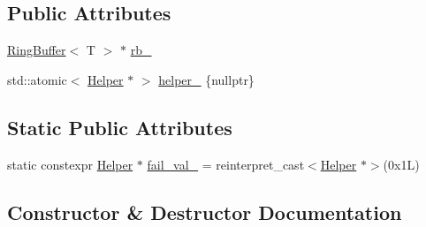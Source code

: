 \subsection*{Public Attributes}
\begin{DoxyCompactItemize}
\item 
\hyperlink{classtervel_1_1containers_1_1wf_1_1_ring_buffer}{Ring\+Buffer}$<$ T $>$ $\ast$ \hyperlink{classtervel_1_1containers_1_1wf_1_1_ring_buffer_1_1_buffer_op_a2f8fe07f0f1b404a6cecb43564795973}{rb\+\_\+}
\item 
std\+::atomic$<$ \hyperlink{classtervel_1_1containers_1_1wf_1_1_ring_buffer_1_1_helper}{Helper} $\ast$ $>$ \hyperlink{classtervel_1_1containers_1_1wf_1_1_ring_buffer_1_1_buffer_op_a27d2feab0bcff8ba7f23ffed677b7a6e}{helper\+\_\+} \{nullptr\}
\end{DoxyCompactItemize}
\subsection*{Static Public Attributes}
\begin{DoxyCompactItemize}
\item 
static constexpr \hyperlink{classtervel_1_1containers_1_1wf_1_1_ring_buffer_1_1_helper}{Helper} $\ast$ \hyperlink{classtervel_1_1containers_1_1wf_1_1_ring_buffer_1_1_buffer_op_abdce2129a65d213a747850f8dbe0c6b8}{fail\+\_\+val\+\_\+} = reinterpret\+\_\+cast$<$\hyperlink{classtervel_1_1containers_1_1wf_1_1_ring_buffer_1_1_helper}{Helper} $\ast$$>$(0x1\+L)
\end{DoxyCompactItemize}


\subsection{Constructor \& Destructor Documentation}
\hypertarget{classtervel_1_1containers_1_1wf_1_1_ring_buffer_1_1_buffer_op_a3beeae0f911b913a997c4841392c577c}{}
